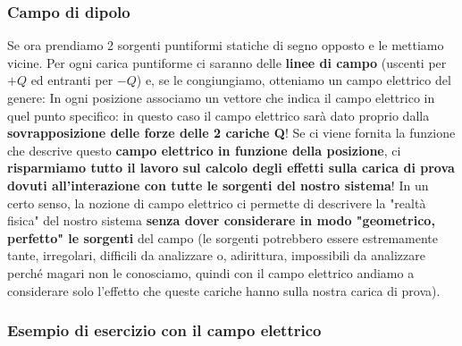         \subsubsection{Campo di dipolo}
            Se ora prendiamo 2 sorgenti puntiformi statiche di segno opposto e le mettiamo vicine. Per ogni carica puntiforme ci saranno delle \textbf{linee di campo} (uscenti per $+Q$ ed entranti per $-Q$) e, se le congiungiamo, otteniamo un campo elettrico del genere:
            In ogni posizione associamo un vettore che indica il campo elettrico in quel punto specifico: in questo caso il campo elettrico sarà dato proprio dalla \textbf{sovrapposizione delle forze delle 2 cariche Q}! Se ci viene fornita la funzione che descrive questo \textbf{campo elettrico in funzione della posizione}, ci \textbf{risparmiamo tutto il lavoro sul calcolo degli effetti sulla carica di prova dovuti all'interazione con tutte le sorgenti del nostro sistema}! In un certo senso, la nozione di campo elettrico ci permette di descrivere la "realtà fisica" del nostro sistema \textbf{senza dover considerare in modo "geometrico, perfetto" le sorgenti} del campo (le sorgenti potrebbero essere estremamente tante, irregolari, difficili da analizzare o, adirittura, impossibili da analizzare perché magari non le conosciamo, quindi con il campo elettrico andiamo a considerare solo l'effetto che queste cariche hanno sulla nostra carica di prova).

        \subsubsection{Esempio di esercizio con il campo elettrico}
